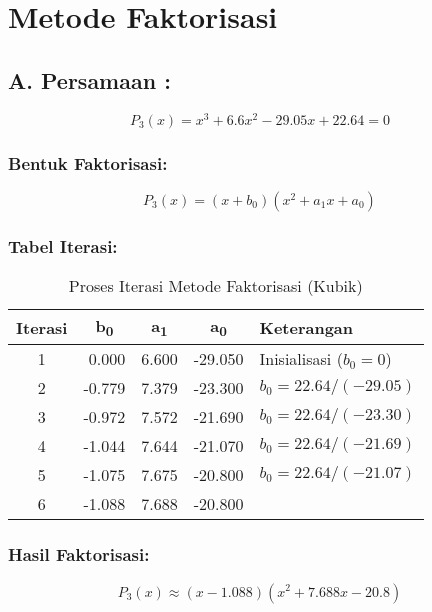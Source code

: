\documentclass{article}
\begin{document}
\section*{Metode Faktorisasi}
\subsection*{A. Persamaan :}

\begin{equation}
    P_3(x) = x^3 + 6.6x^2 - 29.05x + 22.64 = 0
\end{equation}

\subsubsection*{Bentuk Faktorisasi:}
\begin{equation}
    P_3(x) = (x + b_0)(x^2 + a_1x + a_0)
\end{equation}

\subsubsection*{Tabel Iterasi:}
\begin{table}[h]
\centering
\caption{Proses Iterasi Metode Faktorisasi (Kubik)}
\begin{tabular}{|c|r|r|r|l|}
\hline
\textbf{Iterasi} & \multicolumn{1}{c|}{\textbf{b\textsubscript{0}}} & \multicolumn{1}{c|}{\textbf{a\textsubscript{1}}} & \multicolumn{1}{c|}{\textbf{a\textsubscript{0}}} & \textbf{Keterangan} \\ \hline
1 & 0.000 & 6.600 & -29.050 & Inisialisasi ($b_0 = 0$) \\ \hline
2 & -0.779 & 7.379 & -23.300 & $b_0 = 22.64/(-29.05)$ \\ \hline
3 & -0.972 & 7.572 & -21.690 & $b_0 = 22.64/(-23.30)$ \\ \hline
4 & -1.044 & 7.644 & -21.070 & $b_0 = 22.64/(-21.69)$ \\ \hline
5 & -1.075 & 7.675 & -20.800 & $b_0 = 22.64/(-21.07)$ \\ \hline
6 & -1.088 & 7.688 & -20.800 &  \\ \hline
\end{tabular}
\end{table}

\subsubsection*{Hasil Faktorisasi:}
\begin{equation}
    P_3(x) \approx (x - 1.088)(x^2 + 7.688x - 20.8)
\end{equation}
\end{document}
